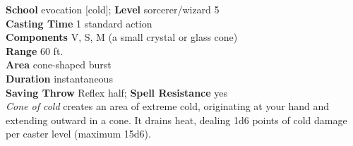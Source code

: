\textbf{School} evocation [cold]; \textbf{Level} sorcerer/wizard 5\\
\textbf{Casting Time} 1 standard action\\
\textbf{Components} V, S, M (a small crystal or glass cone)\\
\textbf{Range} 60 ft.\\
\textbf{Area} cone-shaped burst\\
\textbf{Duration} instantaneous\\
\textbf{Saving Throw} Reflex half; \textbf{Spell Resistance} yes\\
\textit{Cone of cold }creates an area of extreme cold, originating at your hand and extending outward in a cone. It drains heat, dealing 1d6 points of cold damage per caster level (maximum 15d6).\\
